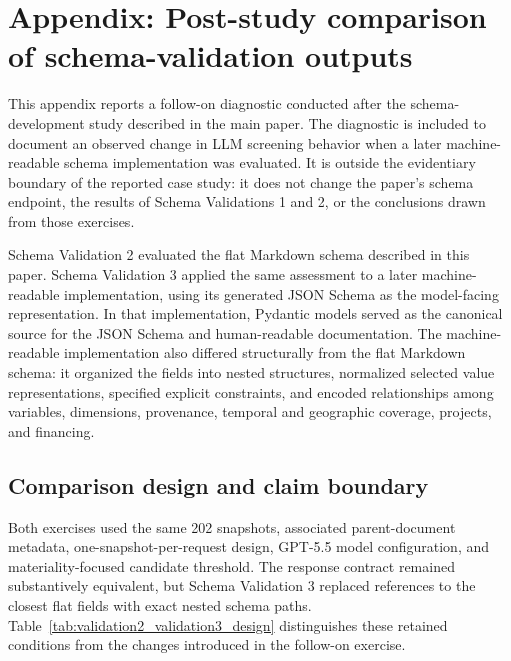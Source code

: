 \documentclass{article}
\begin{document}
\clearpage

\section{Appendix: Post-study comparison of schema-validation outputs}
\label{appendix:post_study_validation_comparison}

This appendix reports a follow-on diagnostic conducted after the schema-development study described in the main paper. The diagnostic is included to document an observed change in LLM screening behavior when a later machine-readable schema implementation was evaluated. It is outside the evidentiary boundary of the reported case study: it does not change the paper's schema endpoint, the results of Schema Validations 1 and 2, or the conclusions drawn from those exercises.

Schema Validation 2 evaluated the flat Markdown schema described in this paper. Schema Validation 3 applied the same assessment to a later machine-readable implementation, using its generated JSON Schema as the model-facing representation. In that implementation, Pydantic models served as the canonical source for the JSON Schema and human-readable documentation. The machine-readable implementation also differed structurally from the flat Markdown schema: it organized the fields into nested structures, normalized selected value representations, specified explicit constraints, and encoded relationships among variables, dimensions, provenance, temporal and geographic coverage, projects, and financing.

\subsection{Comparison design and claim boundary}

Both exercises used the same 202 snapshots, associated parent-document metadata, one-snapshot-per-request design, GPT-5.5 model configuration, and materiality-focused candidate threshold. The response contract remained substantively equivalent, but Schema Validation 3 replaced references to the closest flat fields with exact nested schema paths. Table~\ref{tab:validation2_validation3_design} distinguishes these retained conditions from the changes introduced in the follow-on exercise.
\end{document}
